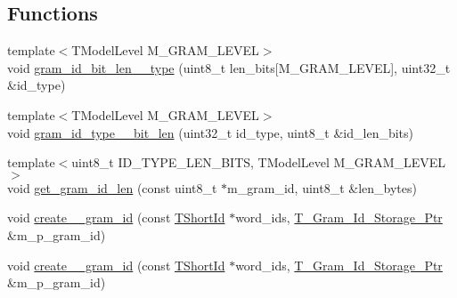 \subsection*{Functions}
\begin{DoxyCompactItemize}
\item 
{\footnotesize template$<$T\+Model\+Level M\+\_\+\+G\+R\+A\+M\+\_\+\+L\+E\+V\+E\+L$>$ }\\void \hyperlink{namespaceuva_1_1smt_1_1tries_1_1mgrams_1_1_____bit___m___gram___id_aa956d3bdac08050d76e83e0fded4030b}{gram\+\_\+id\+\_\+bit\+\_\+len\+\_\+\_\+type} (uint8\+\_\+t len\+\_\+bits\mbox{[}M\+\_\+\+G\+R\+A\+M\+\_\+\+L\+E\+V\+E\+L\mbox{]}, uint32\+\_\+t \&id\+\_\+type)
\item 
{\footnotesize template$<$T\+Model\+Level M\+\_\+\+G\+R\+A\+M\+\_\+\+L\+E\+V\+E\+L$>$ }\\void \hyperlink{namespaceuva_1_1smt_1_1tries_1_1mgrams_1_1_____bit___m___gram___id_afbc0342a200f05497cbd3a8e83169d5b}{gram\+\_\+id\+\_\+type\+\_\+\_\+bit\+\_\+len} (uint32\+\_\+t id\+\_\+type, uint8\+\_\+t \&id\+\_\+len\+\_\+bits)
\item 
{\footnotesize template$<$uint8\+\_\+t I\+D\+\_\+\+T\+Y\+P\+E\+\_\+\+L\+E\+N\+\_\+\+B\+I\+T\+S, T\+Model\+Level M\+\_\+\+G\+R\+A\+M\+\_\+\+L\+E\+V\+E\+L$>$ }\\void \hyperlink{namespaceuva_1_1smt_1_1tries_1_1mgrams_1_1_____bit___m___gram___id_a3af6d3e4f98f0a1a83225394b3cd66a0}{get\+\_\+gram\+\_\+id\+\_\+len} (const uint8\+\_\+t $\ast$m\+\_\+gram\+\_\+id, uint8\+\_\+t \&len\+\_\+bytes)
\item 
void \hyperlink{namespaceuva_1_1smt_1_1tries_1_1mgrams_1_1_____bit___m___gram___id_a206e1709f2246f13bd0a6d99c3527a81}{create\+\_\+\_\+gram\+\_\+id} (const \hyperlink{namespaceuva_1_1smt_1_1hashing_adcf22e1982ad09d3a63494c006267469}{T\+Short\+Id} $\ast$word\+\_\+ids, \hyperlink{namespaceuva_1_1smt_1_1tries_1_1mgrams_1_1_m___gram___id_a478e6468dbd5dab37599c566d77c845c}{T\+\_\+\+Gram\+\_\+\+Id\+\_\+\+Storage\+\_\+\+Ptr} \&m\+\_\+p\+\_\+gram\+\_\+id)
\item 
void \hyperlink{namespaceuva_1_1smt_1_1tries_1_1mgrams_1_1_____bit___m___gram___id_a4615f061ba8125930dece4d7f1e062b0}{create\+\_\+\_\+gram\+\_\+id} (const \hyperlink{namespaceuva_1_1smt_1_1hashing_adcf22e1982ad09d3a63494c006267469}{T\+Short\+Id} $\ast$word\+\_\+ids, \hyperlink{namespaceuva_1_1smt_1_1tries_1_1mgrams_1_1_m___gram___id_a478e6468dbd5dab37599c566d77c845c}{T\+\_\+\+Gram\+\_\+\+Id\+\_\+\+Storage\+\_\+\+Ptr} \&m\+\_\+p\+\_\+gram\+\_\+id)
\item 

\end{DoxyCompactItemize}
